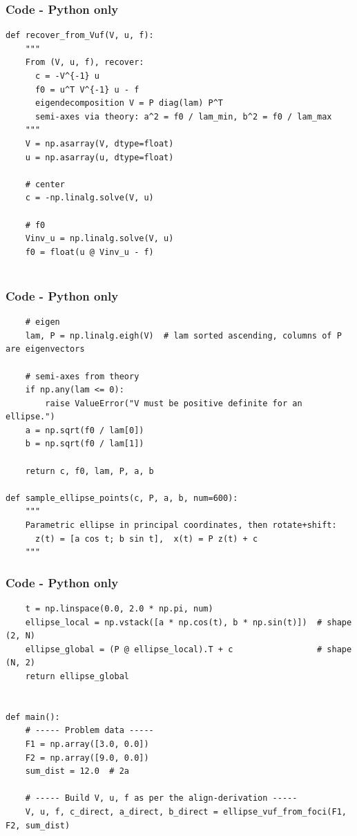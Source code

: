 \documentclass{beamer}
\theoremstyle{remark}
\numberwithin{equation}{section}
\begin{document}
\begin{frame}[fragile]
\frametitle{Code - Python only}
\begin{lstlisting}
def recover_from_Vuf(V, u, f):
    """
    From (V, u, f), recover:
      c = -V^{-1} u
      f0 = u^T V^{-1} u - f
      eigendecomposition V = P diag(lam) P^T
      semi-axes via theory: a^2 = f0 / lam_min, b^2 = f0 / lam_max
    """
    V = np.asarray(V, dtype=float)
    u = np.asarray(u, dtype=float)

    # center
    c = -np.linalg.solve(V, u)

    # f0
    Vinv_u = np.linalg.solve(V, u)
    f0 = float(u @ Vinv_u - f)


\end{lstlisting}
\end{frame}

\begin{frame}[fragile]
\frametitle{Code - Python only}
\begin{lstlisting}
    # eigen
    lam, P = np.linalg.eigh(V)  # lam sorted ascending, columns of P are eigenvectors

    # semi-axes from theory
    if np.any(lam <= 0):
        raise ValueError("V must be positive definite for an ellipse.")
    a = np.sqrt(f0 / lam[0])
    b = np.sqrt(f0 / lam[1])

    return c, f0, lam, P, a, b

def sample_ellipse_points(c, P, a, b, num=600):
    """
    Parametric ellipse in principal coordinates, then rotate+shift:
      z(t) = [a cos t; b sin t],  x(t) = P z(t) + c
    """

\end{lstlisting}
\end{frame}

\begin{frame}[fragile]
\frametitle{Code - Python only}
\begin{lstlisting}
    t = np.linspace(0.0, 2.0 * np.pi, num)
    ellipse_local = np.vstack([a * np.cos(t), b * np.sin(t)])  # shape (2, N)
    ellipse_global = (P @ ellipse_local).T + c                 # shape (N, 2)
    return ellipse_global


def main():
    # ----- Problem data -----
    F1 = np.array([3.0, 0.0])
    F2 = np.array([9.0, 0.0])
    sum_dist = 12.0  # 2a

    # ----- Build V, u, f as per the align-derivation -----
    V, u, f, c_direct, a_direct, b_direct = ellipse_vuf_from_foci(F1, F2, sum_dist)


\end{lstlisting}
\end{frame}
\end{document}
